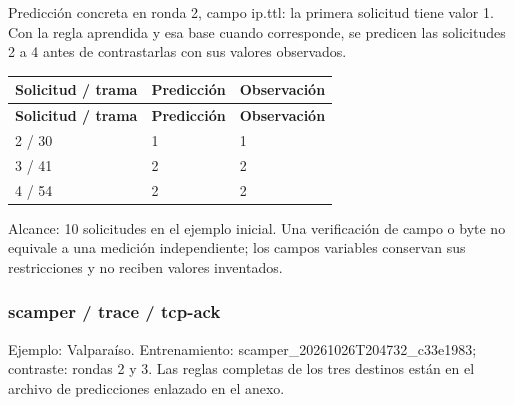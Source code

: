 Predicción concreta en ronda 2, campo ip.ttl: la primera solicitud tiene valor 1. Con la regla aprendida y esa base cuando corresponde, se predicen las solicitudes 2 a 4 antes de contrastarlas con sus valores observados.

\begingroup
\fontsize{9}{11}\selectfont
\addtocounter{table}{-1}
\begin{longtable}{p{3.2cm}p{5.1cm}p{5.1cm}}
\toprule
\textbf{Solicitud / trama} & \textbf{Predicción} & \textbf{Observación} \\ \midrule
\endfirsthead
\toprule
\textbf{Solicitud / trama} & \textbf{Predicción} & \textbf{Observación} \\ \midrule
\endhead
2 / 30 & 1 & 1 \\
3 / 41 & 2 & 2 \\
4 / 54 & 2 & 2 \\
\bottomrule
\end{longtable}
\endgroup
Alcance: 10 solicitudes en el ejemplo inicial. Una verificación de campo o byte no equivale a una medición independiente; los campos variables conservan sus restricciones y no reciben valores inventados.

\subsubsection{scamper / trace / tcp-ack}
Ejemplo: Valparaíso. Entrenamiento: scamper\_\allowbreak{}20261026T204732\_\allowbreak{}c33e1983; contraste: rondas 2 y 3. Las reglas completas de los tres destinos están en el archivo de predicciones enlazado en el anexo.

